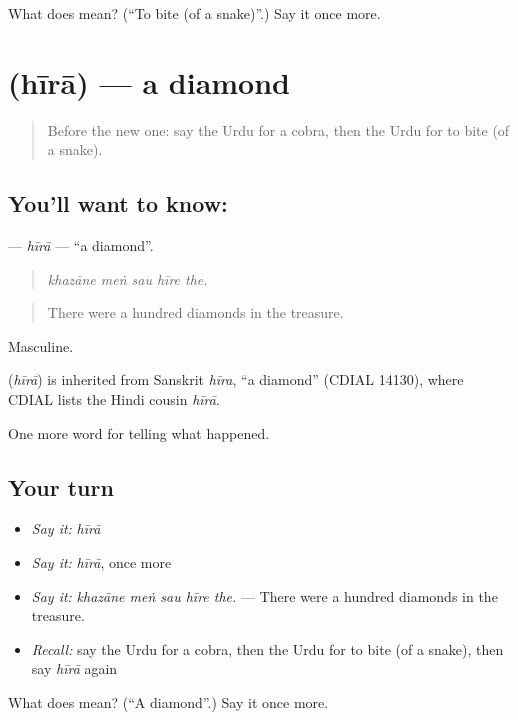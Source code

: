 \begin{tcolorbox}[breakable,colback=teal!4,colframe=teal!35!black,title={Before you move on}]
What does  mean? (\textquotedblleft{}To bite (of a snake)\textquotedblright{}.) Say it once more.
\end{tcolorbox}
\section[\texorpdfstring{\ur{ہیرا} (hīrā)}{ہیرا (hīrā)}]{ (hīrā) — a diamond}

\label{lesson:UR-C327-hira}



\begin{quote}
Before the new one: say the Urdu for a cobra, then the Urdu for to bite (of a snake).
\end{quote}

\subsection*{You'll want to know: }
\textbf{} — \emph{hīrā} — \textquotedblleft{}a diamond\textquotedblright{}.

\begin{quote}
    
\end{quote}

\begin{quote}
\emph{khazāne meṅ sau hīre the.}
\end{quote}

\begin{quote}
There were a hundred diamonds in the treasure.
\end{quote}

Masculine.

\begin{cousinweb}
\textbf{} (\emph{hīrā}) is inherited from Sanskrit \emph{hīra}, \textquotedblleft{}a diamond\textquotedblright{} (CDIAL 14130), where CDIAL lists the Hindi cousin \emph{hīrā}.
\end{cousinweb}

\begin{grammarlens}[title={What you've built}]
One more word for telling what happened.
\end{grammarlens}

\subsection*{Your turn}
\begin{itemize}
\raggedright
  \item \emph{Say it:} \emph{hīrā}
  \item \emph{Say it:} \emph{hīrā}, once more
  \item \emph{Say it:} \emph{khazāne meṅ sau hīre the.} — There were a hundred diamonds in the treasure.
  \item \emph{Recall:} say the Urdu for a cobra, then the Urdu for to bite (of a snake), then say \emph{hīrā} again
\end{itemize}

\begin{tcolorbox}[breakable,colback=teal!4,colframe=teal!35!black,title={Before you move on}]
What does  mean? (\textquotedblleft{}A diamond\textquotedblright{}.) Say it once more.
\end{tcolorbox}
